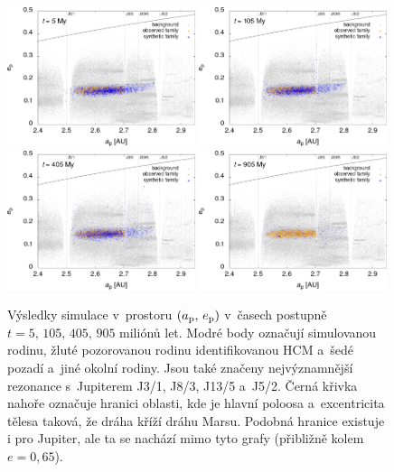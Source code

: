 \documentclass[A4paper, 12pt, oneside]{book}
\begin{document}
\immediate{}
\immediate{}
\immediate{}
\immediate{}
\begin{figure}
	\centering
	\includegraphics[width=0.49\textwidth]{obr/ae_5t.png}
	\includegraphics[width=0.49\textwidth]{obr/ae_105t.png}\\
	\includegraphics[width=0.49\textwidth]{obr/ae_405t.png}
	\includegraphics[width=0.49\textwidth]{obr/ae_905t.png}
	\caption{Výsledky simulace v~prostoru $(a_{\rm p},\,e_{\rm p})$ v~časech postupně $t=5,\,105,\,405,\,905$ miliónů let. Modré body označují simulovanou rodinu, žluté pozorovanou rodinu identifikovanou HCM a~šedé pozadí a~jiné okolní rodiny. Jsou také značeny nejvýznamnější rezonance s~Jupiterem J3/1, J8/3, J13/5 a~J5/2. Černá křivka nahoře označuje hranici oblasti, kde je hlavní poloosa a~excentricita tělesa taková, že dráha kříží dráhu Marsu. Podobná hranice existuje i pro Jupiter, ale ta se nachází mimo tyto grafy (přibližně kolem $e=0,65$). } \label{fig_ae_sim}
\end{figure}	
\end{document}
